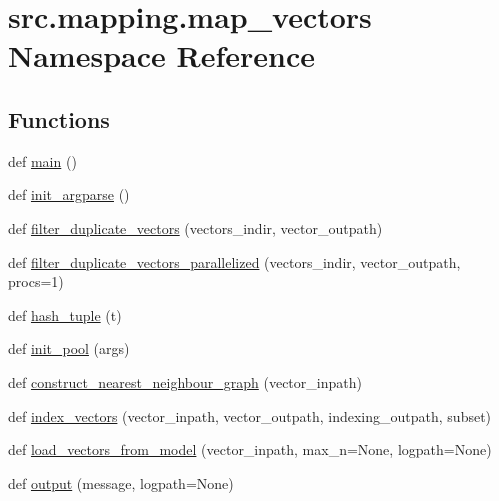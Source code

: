 \hypertarget{namespacesrc_1_1mapping_1_1map__vectors}{}\section{src.\+mapping.\+map\+\_\+vectors Namespace Reference}
\label{namespacesrc_1_1mapping_1_1map__vectors}
\subsection*{Functions}
\begin{DoxyCompactItemize}
\item 
def \hyperlink{namespacesrc_1_1mapping_1_1map__vectors_a0161781441488ca465523d5a643ecaaf}{main} ()
\item 
def \hyperlink{namespacesrc_1_1mapping_1_1map__vectors_a3545ae9cd5ed40949a82e014eacd1e4e}{init\+\_\+argparse} ()
\item 
def \hyperlink{namespacesrc_1_1mapping_1_1map__vectors_ab13deda815179120c203a07ece02beec}{filter\+\_\+duplicate\+\_\+vectors} (vectors\+\_\+indir, vector\+\_\+outpath)
\item 
def \hyperlink{namespacesrc_1_1mapping_1_1map__vectors_ae611c8e03be1c9588fd881fba3c013c1}{filter\+\_\+duplicate\+\_\+vectors\+\_\+parallelized} (vectors\+\_\+indir, vector\+\_\+outpath, procs=1)
\item 
def \hyperlink{namespacesrc_1_1mapping_1_1map__vectors_a81dbd38a7ba06b138e44af1f5db25465}{hash\+\_\+tuple} (t)
\item 
def \hyperlink{namespacesrc_1_1mapping_1_1map__vectors_ac5df7b9ead7f9e7e919801479599c565}{init\+\_\+pool} (args)
\item 
def \hyperlink{namespacesrc_1_1mapping_1_1map__vectors_a0a0d770aaada54ea96973b437aa2e6b9}{construct\+\_\+nearest\+\_\+neighbour\+\_\+graph} (vector\+\_\+inpath)
\item 
def \hyperlink{namespacesrc_1_1mapping_1_1map__vectors_a01745bfeafcac03ab1afda45f26b3b66}{index\+\_\+vectors} (vector\+\_\+inpath, vector\+\_\+outpath, indexing\+\_\+outpath, subset)
\item 
def \hyperlink{namespacesrc_1_1mapping_1_1map__vectors_a95a6d3bbb8dc60a6a170514d3efb17d5}{load\+\_\+vectors\+\_\+from\+\_\+model} (vector\+\_\+inpath, max\+\_\+n=None, logpath=None)
\item 
def \hyperlink{namespacesrc_1_1mapping_1_1map__vectors_a32f276c432a2badd251d43d6ee691fb8}{output} (message, logpath=None)
\item 

\end{DoxyCompactItemize}
